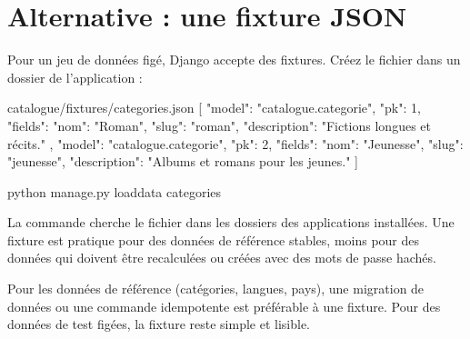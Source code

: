\section{Alternative : une fixture JSON}

Pour un jeu de données figé, Django accepte des fixtures. Créez le fichier
 dans un dossier  de l'application :

\begin{codebox}[json]{catalogue/fixtures/categories.json}
[
  {
    "model": "catalogue.categorie",
    "pk": 1,
    "fields": {
      "nom": "Roman",
      "slug": "roman",
      "description": "Fictions longues et récits."
    }
  },
  {
    "model": "catalogue.categorie",
    "pk": 2,
    "fields": {
      "nom": "Jeunesse",
      "slug": "jeunesse",
      "description": "Albums et romans pour les jeunes."
    }
  }
]
\end{codebox}

\begin{terminal}
python manage.py loaddata categories
\end{terminal}

\begin{note}
La commande  cherche le fichier dans les dossiers
 des applications installées. Une fixture est pratique pour des
données de référence stables, moins pour des données qui doivent être recalculées
ou créées avec des mots de passe hachés.
\end{note}

\begin{bonne}
Pour les données de référence (catégories, langues, pays), une migration de données
ou une commande idempotente est préférable à une fixture. Pour des données de test
figées, la fixture reste simple et lisible.
\end{bonne}

